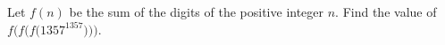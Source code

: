 Let $f(n)$ be the sum of the digits of the positive integer $n$. Find the value of $f\bigl(f\bigl(f\bigl(1357^{1357}\bigr)\bigr)\bigr)$.

